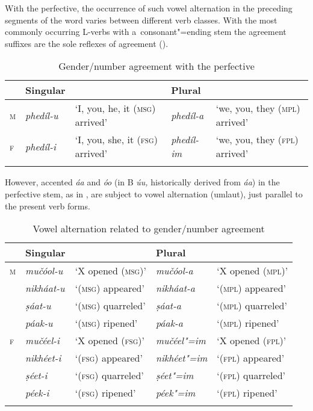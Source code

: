 With the perfective, the occurrence of such vowel alternation in the preceding segments of the word varies between different verb classes. With the most commonly occurring L-verbs with a~consonant"=ending stem the agreement suffixes are the sole reflexes of agreement ().


\begin{table}[ht]
\caption{Gender/number agreement with the perfective}

\begin{tabularx}{\textwidth}{ l l Q l Q }
\lsptoprule
&
Singular &
&
Plural &
\\\midrule
\textsc{m} &
\textit{phedíl-u} &
`I, you, he, it (\textsc{msg}) arrived' &
\textit{phedíl-a} &
`we, you, they (\textsc{mpl}) arrived'\\
\textsc{f} &
\textit{phedíl-i} &
`I, you, she, it (\textsc{fsg}) arrived' &
\textit{phedíl-im} &
`we, you, they (\textsc{fpl}) arrived'\\\lspbottomrule
\end{tabularx}
\label{tab:8-19}
\end{table}


However, accented \textit{áa} and \textit{óo} (in B \textit{úu,} historically derived from \textit{áa}) in the perfective stem, as in , are subject to vowel alternation (umlaut), just parallel to the present verb forms. 


\begin{table}[p]
\caption{Vowel alternation related to gender/number agreement}

\begin{tabularx}{\textwidth}{ l l@{\hspace{20pt}} l@{\hspace{20pt}} l@{\hspace{20pt}} l@{\hspace{20pt}} }
\lsptoprule
&
Singular &
&
Plural &
\\\midrule
\textsc{m} &
\textit{mučóol-u} &
`X opened (\textsc{msg})' &
\textit{mučóol-a} &
`X opened (\textsc{mpl})'\\
&
\textit{nikháat-u} &
`(\textsc{msg}) appeared' &
\textit{nikháat-a} &
`(\textsc{mpl}) appeared'\\
&
\textit{ṣáat-u} &
`(\textsc{msg}) quarreled' &
\textit{ṣáat-a} &
`(\textsc{mpl}) quarreled'\\
&
\textit{páak-u} &
`(\textsc{msg}) ripened' &
\textit{páak-a} &
`(\textsc{mpl}) ripened'\\
\textsc{f} &
\textit{mučéel-i} &
`X opened (\textsc{fsg})' &
\textit{mučéel"=im} &
`X opened (\textsc{fpl})'\\
&
\textit{nikhéet-i} &
`(\textsc{fsg}) appeared' &
\textit{nikhéet"=im} &
`(\textsc{fpl}) appeared'\\
&
\textit{ṣéet-i} &
`(\textsc{fsg}) quarreled' &
\textit{ṣéet"=im} &
`(\textsc{fpl}) quarreled'\\
&
\textit{péek-i} &
`(\textsc{fsg}) ripened' &
\textit{péek"=im} &
`(\textsc{fpl}) ripened'\\\lspbottomrule
\end{tabularx}
\label{tab:8-20}
\end{table}



